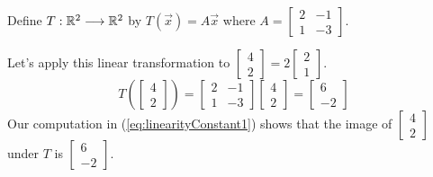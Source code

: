 \documentclass{ximera}
\begin{document}
\begin{exploration}\label{exp:linearityConstant}
    Define $T:\mathbb{R}^2\longrightarrow\mathbb{R}^2$ by $T(\vec{x})=A\vec{x}$ where $A=\begin{bmatrix}2&-1\\1&-3\end{bmatrix}$.

    Let's apply this linear transformation to $\begin{bmatrix}4\\2\end{bmatrix}=2\begin{bmatrix}2\\1\end{bmatrix}$.
\begin{equation}\label{eq:linearityConstant1}
T\left(\begin{bmatrix}4\\2\end{bmatrix}\right)=\begin{bmatrix}2&-1\\1&-3\end{bmatrix}\begin{bmatrix}4\\2\end{bmatrix}=\begin{bmatrix}6\\-2\end{bmatrix}
\end{equation}
Our computation in (\ref{eq:linearityConstant1}) shows that the image of $\begin{bmatrix}4\\2\end{bmatrix}$ under $T$ is $\begin{bmatrix}6\\-2\end{bmatrix}$.


\end{exploration}
\end{document}
